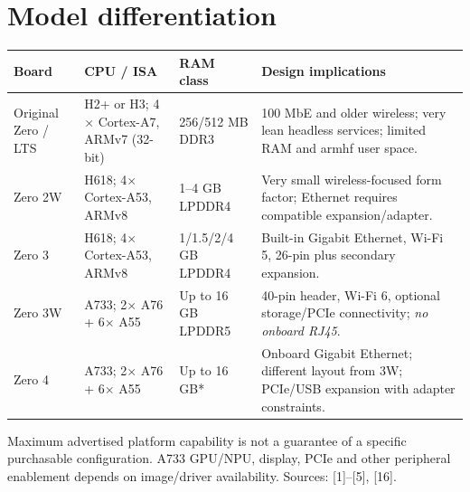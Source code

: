 \documentclass[10pt,oneside,openany]{report}
\begin{document}
\section{Model differentiation}
\begin{center}
\small\begin{tabularx}{\textwidth}{@{}p{2.45cm}p{2.45cm}p{2.0cm}X@{}}\toprule
\textbf{Board} & \textbf{CPU / ISA} & \textbf{RAM class} & \textbf{Design implications}\\\midrule
Original Zero / LTS & H2+ or H3; 4\(\times\) Cortex-A7, ARMv7 (32-bit) & 256/512 MB DDR3 & 100 MbE and older wireless; very lean headless services; limited RAM and armhf user space.\\
Zero 2W & H618; 4\(\times\) Cortex-A53, ARMv8 & 1--4 GB LPDDR4 & Very small wireless-focused form factor; Ethernet requires compatible expansion/adapter.\\
Zero 3 & H618; 4\(\times\) Cortex-A53, ARMv8 & 1/1.5/2/4 GB LPDDR4 & Built-in Gigabit Ethernet, Wi-Fi 5, 26-pin plus secondary expansion.\\
Zero 3W & A733; 2\(\times\) A76 + 6\(\times\) A55 & Up to 16 GB LPDDR5 & 40-pin header, Wi-Fi 6, optional storage/PCIe connectivity; \emph{no onboard RJ45}.\\
Zero 4 & A733; 2\(\times\) A76 + 6\(\times\) A55 & Up to 16 GB* & Onboard Gigabit Ethernet; different layout from 3W; PCIe/USB expansion with adapter constraints.\\\bottomrule
\end{tabularx}
\end{center}
{\footnotesize *Maximum advertised platform capability is not a guarantee of a specific purchasable configuration. A733 GPU/NPU, display, PCIe and other peripheral enablement depends on image/driver availability. Sources: [1]--[5], [16].}\par
\end{document}
